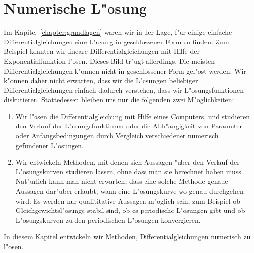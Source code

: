 %
%
%
\chapter{Numerische L"osung\label{chapter:numerik}}
\lhead{}
Im Kapitel~\ref{chapter:grundlagen} waren wir in der Lage, f"ur einige
einfache Differentialgleichungen eine L"osung in geschlossener Form
zu finden.
Zum Beispiel konnten wir lineare Differentialgleichungen mit Hilfe
der Exponentialfunktion l"osen.
Dieses Bild tr"ugt allerdings.
Die meisten Differentialgleichungen k"onnen nicht in geschlossener
Form gel"ost werden.
Wir k"onnen daher nicht erwarten, dass wir die L"osungen beliebiger
Differentialgleichungen einfach dadurch verstehen, dass wir
L"osungsfunktionen diskutieren.
Stattedessen bleiben uns nur die folgenden zwei M"oglichkeiten:
\begin{enumerate}
\item
Wir l"osen die Differentialgleichung mit Hilfe eines Computers,
und studieren den Verlauf der L"osungsfunktionen oder die Abh"angigkeit
von Parameter oder Anfangsbedingungen durch Vergleich verschiedener
numerisch gefundener L"osungen.
\item
Wir entwickeln Methoden, mit denen sich Aussagen "uber den Verlauf der
L"osungskurven studieren lassen, ohne dass man sie berechnet haben muss.
Nat"urlich kann man nicht erwarten, dass eine solche Methode genaue
Aussagen dar"uber erlaubt, wann eine L"osungskurve wo genau durchgehen
wird.
Es werden nur qualititative Aussagen m"oglich sein, zum Beispiel ob
Gleichgewichtsl"osunge stabil sind, ob es periodische L"osungen gibt
und ob L"osungskurven zu den periodischen L"osungen konvergieren.
\end{enumerate}
In diesem Kapitel entwickeln wir Methoden, Differentialgleichungen 
numerisch zu l"osen.

